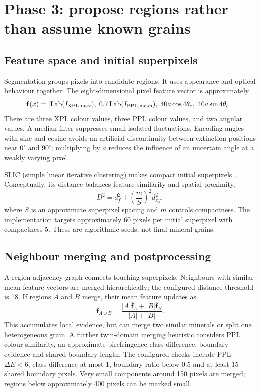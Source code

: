 \section{Phase 3: propose regions rather than assume known grains}
\subsection{Feature space and initial superpixels}
Segmentation groups pixels into candidate regions. It uses appearance and optical behaviour together. The eight-dimensional pixel feature vector is approximately
\begin{equation}
\mathbf f(x)=\left[\operatorname{Lab}(I_{\rm XPL,max}),\;
0.7\operatorname{Lab}(I_{\rm PPL,mean}),\;
40a\cos4\theta_e,\;40a\sin4\theta_e\right].
\end{equation}
There are three XPL colour values, three PPL colour values, and two angular values. A median filter suppresses small isolated fluctuations. Encoding angles with sine and cosine avoids an artificial discontinuity between extinction positions near $0^\circ$ and $90^\circ$; multiplying by $a$ reduces the influence of an uncertain angle at a weakly varying pixel.

SLIC (simple linear iterative clustering) makes compact initial superpixels \cite{slic}. Conceptually, its distance balances feature similarity and spatial proximity,
\begin{equation}
D^2=d_f^2+\left(\frac{m}{S}\right)^2d_{xy}^2,
\end{equation}
where $S$ is an approximate superpixel spacing and $m$ controls compactness. The implementation targets approximately 60 pixels per initial superpixel with compactness 5. These are algorithmic seeds, not final mineral grains.

\subsection{Neighbour merging and postprocessing}
A region adjacency graph connects touching superpixels. Neighbours with similar mean feature vectors are merged hierarchically; the configured distance threshold is 18. If regions $A$ and $B$ merge, their mean feature updates as
\begin{equation}
\overline{\mathbf f}_{A\cup B}=\frac{|A|\overline{\mathbf f}_{A}+|B|\overline{\mathbf f}_{B}}{|A|+|B|}.
\end{equation}
This accumulates local evidence, but can merge two similar minerals or split one heterogeneous grain. A further twin-domain merging heuristic considers PPL colour similarity, an approximate birefringence-class difference, boundary evidence and shared boundary length. The configured checks include PPL $\Delta E<6$, class difference at most 1, boundary ratio below 0.5 and at least 15 shared boundary pixels. Very small components around 150 pixels are merged; regions below approximately 400 pixels can be marked small.

